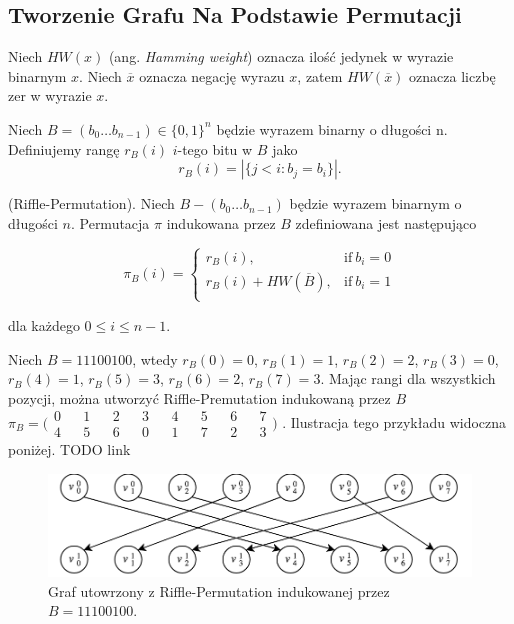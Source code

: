 \subsection{Tworzenie Grafu Na Podstawie Permutacji}

Niech $HW(x)$ (ang. \textit{Hamming weight}) oznacza ilość jedynek w wyrazie binarnym $x$. Niech $\overline{x}$ oznacza negację wyrazu $x$, zatem $HW(\overline{x})$ oznacza liczbę zer w wyrazie $x$.

\begin{definition}
	Niech $B = (b_{0} \dots b_{n-1}) \in \{ 0, 1 \}^{n}$ będzie wyrazem binarny o długości n. Definiujemy rangę $r_{B}(i)$ $i$-tego bitu w $B$ jako
	$$ r_{B}(i) = | \{ j < i : b_{j} = b_{i} \} | .$$
\end{definition}

\begin{definition}
	(Riffle-Permutation). Niech $B - (b_{0} \dots b_{n - 1})$ będzie wyrazem binarnym o długości $n$. Permutacja $\pi$ indukowana przez $B$ zdefiniowana jest następująco

	$$
	\pi_{B}(i) =
	\begin{cases}
	r_{B}(i), & \text{if}\ b_{i} = 0 \\
	r_{B}(i) + HW(\overline{B}), & \text{if}\ b_{i} = 1 \\
	\end{cases}
	$$
	
	dla każdego $ 0 \leq i \leq n-1$.
	
\end{definition}

\begin{example}
	Niech $B = 11100100$, wtedy $r_{B}(0) = 0$, $r_{B}(1) = 1$, $r_{B}(2) = 2$,
	$r_{B}(3) = 0$, $r_{B}(4) = 1$, $r_{B}(5) = 3$, $r_{B}(6) = 2$, $r_{B}(7) = 3$.
	Mając rangi dla wszystkich pozycji, można utworzyć Riffle-Premutation indukowaną przez $B$ 
	$\pi_{B} = \bigl( \begin{smallmatrix}
	0 && 1 && 2 && 3 && 4 && 5 && 6 && 7 \\
	4 && 5 && 6 && 0 && 1 && 7 && 2 && 3
	\end{smallmatrix} \bigr) $ .
	Ilustracja tego przykładu widoczna poniżej. TODO link	
\end{example}

\begin{figure}[h]
	\includegraphics[width=\textwidth]{rp1.png}
	\centering
	\caption{Graf utowrzony z Riffle-Permutation indukowanej przez $B=11100100$.}
\end{figure}

